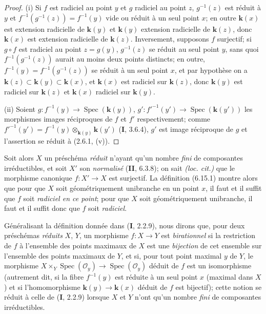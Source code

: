 \begin{proof}
(i) Si $f$ est radiciel au point $y$ et $g$ radiciel au point $z$,
$g^{-1}(z)$ est réduit à $y$ et
$f^{-1}(g^{-1}(z))=f^{-1}(y)$ vide ou réduit à un seul point $x$; en
outre $\boldsymbol{k}(x)$ est extension radicielle de $\boldsymbol{k}(y)$ et $\boldsymbol{k}(y)$ extension
radicielle de $\boldsymbol{k}(z)$, donc $\boldsymbol{k}(x)$ est extension radicielle de $\boldsymbol{k}(z)$.
Inversement, supposons $f$ surjectif; si $g\circ f$ est radiciel au point
$z=g(y)$, $g^{-1}(z)$ se réduit au seul point $y$, sans quoi
$f^{-1}(g^{-1}(z))$ aurait au moins deux points distincts; en outre,
$f^{-1}(y)=f^{-1}(g^{-1}(z))$ se réduit à un seul point $x$, et par
hypothèse on a $\boldsymbol{k}(z)\subset \boldsymbol{k}(y)\subset \boldsymbol{k}(x)$, et $\boldsymbol{k}(x)$ est radiciel sur
$\boldsymbol{k}(z)$, donc $\boldsymbol{k}(y)$ est radiciel sur $\boldsymbol{k}(z)$ et $\boldsymbol{k}(x)$ radiciel sur $\boldsymbol{k}(y)$.

(ii) Soient $g:f^{-1}(y)\to\operatorname{Spec}(\boldsymbol{k}(y))$,
$g':f'^{-1}(y')\to\operatorname{Spec}(\boldsymbol{k}(y'))$ les morphismes images
réciproques de $f$ et $f'$ respectivement; comme
$f'^{-1}(y')=f^{-1}(y)\otimes_{\mathbf{k}(y)}\boldsymbol{k}(y')$ (\textbf{I}, 3.6.4), $g'$ est image
réciproque de $g$ et l'assertion se réduit à (2.6.1, (v)).
\end{proof}

Soit alors $X$ un préschéma \emph{réduit} n'ayant qu'un nombre \emph{fini} de
composantes irréductibles, et soit $X'$ son \emph{normalisé} (\textbf{II}, 6.3.8); on sait
\emph{(loc. cit.)} que le morphisme canonique $f:X'\to X$ est surjectif. La
définition (6.15.1) montre alors que pour que $X$ soit géométriquement
unibranche en un point $x$, il faut et il suffit que $f$ soit \emph{radiciel en ce
point}; pour que $X$ soit géométriquement unibranche, il faut et il suffit
donc que $f$ soit \emph{radiciel}.

\begin{env}[6.15.4]
Généralisant la définition donnée dans (\textbf{I}, 2.2.9), nous dirons que, pour
deux préschémas \emph{réduits} $X$, $Y$, un morphisme $f:X\to Y$ est
\emph{birationnel} si la restriction de $f$ à l'ensemble des points
maximaux de $X$ est une \emph{bijection} de cet ensemble sur l'ensemble des points
maximaux de $Y$, et si, pour tout point maximal $y$ de $Y$, le morphisme
$X\times_Y\operatorname{Spec}(\mathcal O_y)\to\operatorname{Spec}(\mathcal O_y)$ déduit de
$f$ est un isomorphisme (autrement dit, si la fibre $f^{-1}(y)$ est réduite
à un seul point $x$ (maximal dans $X$) et si l'homomorphisme
$\boldsymbol{k}(y)\to \boldsymbol{k}(x)$ déduit de $f$ est bijectif); cette notion se réduit à celle
de (\textbf{I}, 2.2.9) lorsque $X$ et $Y$ n'ont qu'un nombre \emph{fini} de composantes
irréductibles.
\end{env}

